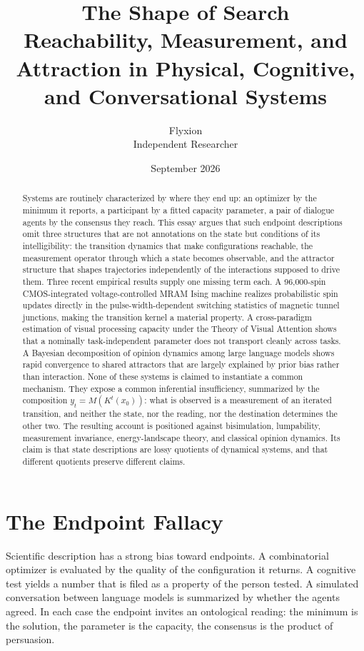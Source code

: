 \documentclass[11pt]{article}
\title{The Shape of Search\\[4pt]
\large Reachability, Measurement, and Attraction in Physical, Cognitive, and Conversational Systems}
\author{Flyxion\\ Independent Researcher}
\date{September 2026}
\theoremstyle{definition}
\theoremstyle{remark}
\begin{document}
\maketitle

\begin{abstract}
Systems are routinely characterized by where they end up: an optimizer by the minimum it reports, a participant by a fitted capacity parameter, a pair of dialogue agents by the consensus they reach. This essay argues that such endpoint descriptions omit three structures that are not annotations on the state but conditions of its intelligibility: the transition dynamics that make configurations reachable, the measurement operator through which a state becomes observable, and the attractor structure that shapes trajectories independently of the interactions supposed to drive them. Three recent empirical results supply one missing term each. A 96,000-spin CMOS-integrated voltage-controlled MRAM Ising machine realizes probabilistic spin updates directly in the pulse-width-dependent switching statistics of magnetic tunnel junctions, making the transition kernel a material property. A cross-paradigm estimation of visual processing capacity under the Theory of Visual Attention shows that a nominally task-independent parameter does not transport cleanly across tasks. A Bayesian decomposition of opinion dynamics among large language models shows rapid convergence to shared attractors that are largely explained by prior bias rather than interaction. None of these systems is claimed to instantiate a common mechanism. They expose a common inferential insufficiency, summarized by the composition $y_t = M(K^t(x_0))$: what is observed is a measurement of an iterated transition, and neither the state, nor the reading, nor the destination determines the other two.
The resulting account is positioned against bisimulation, lumpability, measurement invariance, energy-landscape theory, and classical opinion dynamics. Its claim is that state descriptions are lossy quotients of dynamical systems, and that different quotients preserve different claims.
\end{abstract}

\section{The Endpoint Fallacy}

Scientific description has a strong bias toward endpoints. A combinatorial optimizer is evaluated by the quality of the configuration it returns. A cognitive test yields a number that is filed as a property of the person tested. A simulated conversation between language models is summarized by whether the agents agreed. In each case the endpoint invites an ontological reading: the minimum is the solution, the parameter is the capacity, the consensus is the product of persuasion.
\end{document}
